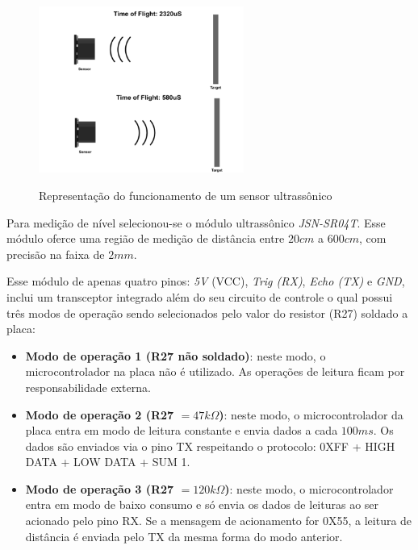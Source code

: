 \begin{figure}[H]
	\centering
	\caption{Representação do funcionamento de um sensor ultrassônico}
	\includegraphics[width=0.6\textwidth]{figuras/ultrassonico_operacao.png}
	\label{fig:operacao_ultrassonico}
\end{figure}

Para medição de nível selecionou-se o módulo ultrassônico \textit{JSN-SR04T}. Esse módulo oferce uma região de medição de distância entre $20 cm$ a $600 cm$, com precisão na faixa de $2 mm$.

Esse módulo de apenas quatro pinos: \textit{5V} (VCC), \textit{Trig (RX)}, \textit{Echo (TX)} e \textit{GND}, inclui um transceptor integrado além do seu circuito de controle o qual possui três modos de operação sendo selecionados pelo valor do resistor (R27) soldado a placa:


\begin{itemize}
	\item \textbf{Modo de operação 1 (R27 não soldado)}: neste modo, o microcontrolador na placa não é utilizado. As operações de leitura ficam por responsabilidade externa. 
	
	\item \textbf{Modo de operação 2 (R27 $= 47k\Omega$)}: neste modo, o microcontrolador da placa entra em modo de leitura constante e envia dados a cada $100ms$. Os dados são enviados via o pino TX respeitando o protocolo: 0XFF + HIGH DATA + LOW DATA + SUM 1.
	
	\item \textbf{Modo de operação 3 (R27 $= 120k\Omega$)}: neste modo, o microcontrolador entra em modo de baixo consumo e só envia os dados de leituras ao ser acionado pelo pino RX. Se a mensagem de acionamento for 0X55, a leitura de distância é enviada pelo TX da mesma forma do modo anterior. \\
\end{itemize}


